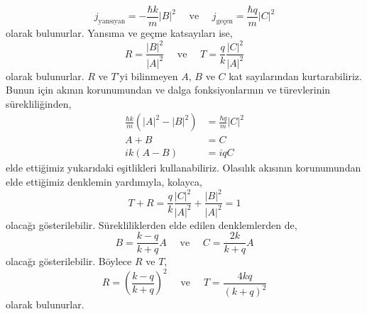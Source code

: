 \documentclass[a4paper,12pt, twoside]{article}
\begin{document}
\begin{equation}
j_\text{yansıyan} =  -\frac{\hbar k}{m} |B|^2 \quad \text{ ve } \quad
j_\text{geçen} =  \frac{\hbar q}{m} |C|^2 
\end{equation}
olarak bulunurlar. Yansıma ve geçme katsayıları ise,
\begin{equation}
R =  \frac{|B|^2}{|A|^2} \quad \text{ ve } \quad
T =  \frac{q}{k} \frac{|C|^2}{|A|^2}
\end{equation}
olarak bulunurlar. $R$ ve $T$'yi bilinmeyen $A$, $B$ ve $C$ kat sayılarından
kurtarabiliriz. Bunun için akının korunumundan ve dalga fonksiyonlarının ve türevlerinin sürekliliğinden,
\begin{align}
\frac { \hbar k } { m } \left( | A | ^ { 2 }  - | B | ^ { 2 } \right) &= \frac { \hbar q } { m } | C | ^ { 2 }\\
A + B  &= C \\
i k ( A - B ) &= i q C
\end{align}
elde ettiğimiz yukarıdaki eşitlikleri kullanabiliriz. Olasılık akısının korunumundan elde ettiğimiz denklemin yardımıyla, kolayca,
\begin{equation}
T + R =  \frac{q}{k} \frac{|C|^2}{|A|^2} + \frac{|B|^2}{|A|^2} = 1
\end{equation}
olacağı gösterilebilir. Sürekliliklerden elde edilen denklemlerden de,
\begin{equation}
B =  \frac{k-q}{k+q} A \quad \text{ ve } \quad
C =  \frac{2k}{k+q} A
\end{equation}
olacağı gösterilebilir. Böylece $R$ ve $T$,
\begin{equation}
R =  \left(\frac{k-q}{k+q}\right)^2  \quad \text{ ve } \quad
T =  \frac{4kq}{(k+q)^2}
\end{equation}
olarak bulunurlar. 
\end{document}
